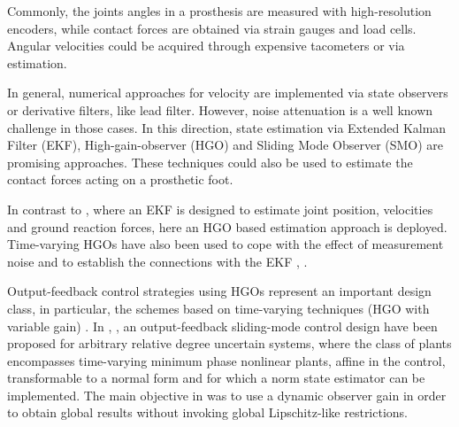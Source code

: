 \documentclass[letterpaper, 10 pt, conference]{ieeeconf}  %
\theoremstyle{plain}
\theoremstyle{definition}
\theoremstyle{remark}
\begin{document}


Commonly, the joints angles in a prosthesis are measured with high-resolution encoders, while contact forces are obtained via strain gauges and load cells. Angular velocities could be acquired through expensive tacometers or via estimation. 

In general, numerical approaches for velocity are implemented via state observers or derivative filters, like lead filter. However,  noise attenuation  is a well known challenge in those cases. In this direction, state estimation via Extended Kalman Filter (EKF), High-gain-observer (HGO) and Sliding Mode Observer (SMO) are promising approaches. These techniques could also be used to estimate the contact forces acting on a prosthetic foot.

In contrast to \cite{Fakoorian2016}, where an EKF is designed to estimate joint position, velocities and ground reaction forces, here an HGO based estimation approach is deployed. Time-varying HGOs have also been used to cope with the effect of measurement noise and to establish the connections with the EKF \cite{AK:07}, \cite{Khalil2009}. 

Output-feedback control strategies using HGOs \cite{OK:97} represent an important design class, in particular, the schemes based on time-varying techniques (HGO with variable gain) \cite{P:01}\cite{KKJ:02} \cite{KKC:03}\cite{LL:05}\cite{AK:07}. In \cite{POH:2011}, \cite{PHCL:2007}, an output-feedback sliding-mode control design have been proposed for arbitrary relative degree uncertain systems, where the class of plants encompasses time-varying minimum phase nonlinear plants, affine in the control, transformable to a normal form and for which a norm state estimator can be implemented. The main objective in \cite{POH:2011} was to use a dynamic observer gain in order to obtain global results without invoking global Lipschitz-like restrictions. 
\end{document}
